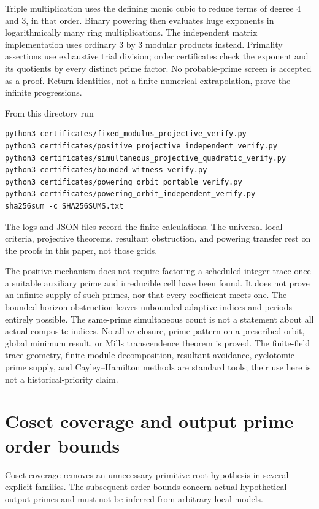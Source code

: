 \documentclass[11pt,a4paper]{article}
\theoremstyle{definition}\newtheorem{definition}[theorem]{Definition}
\theoremstyle{remark}\newtheorem{remark}[theorem]{Remark}
\begin{document}
Triple multiplication uses the defining monic cubic to reduce terms
of degree $4$ and $3$, in that order. Binary powering then evaluates
huge exponents in logarithmically many ring multiplications.
The independent matrix implementation uses ordinary $3$ by $3$
modular products instead. Primality assertions use exhaustive trial
division; order certificates check the exponent and its quotients by
every distinct prime factor. No probable-prime screen is accepted
as a proof. Return identities, not a finite numerical extrapolation,
prove the infinite progressions.

From this directory run
\begin{lstlisting}
python3 certificates/fixed_modulus_projective_verify.py
python3 certificates/positive_projective_independent_verify.py
python3 certificates/simultaneous_projective_quadratic_verify.py
python3 certificates/bounded_witness_verify.py
python3 certificates/powering_orbit_portable_verify.py
python3 certificates/powering_orbit_independent_verify.py
sha256sum -c SHA256SUMS.txt
\end{lstlisting}
The logs and JSON files record the finite calculations. The universal
local criteria, projective theorems, resultant obstruction, and
powering transfer rest on the proofs in this paper, not those grids.


The positive mechanism does not require factoring a scheduled integer
trace once a suitable auxiliary prime and irreducible cell have been
found. It does not prove an infinite supply of such primes, nor that
every coefficient meets one. The bounded-horizon obstruction leaves
unbounded adaptive indices and periods entirely possible. The
same-prime simultaneous count is not a statement about all actual
composite indices. No all-$m$ closure, prime pattern on a prescribed
orbit, global minimum result, or Mills transcendence theorem is proved.
The finite-field trace geometry, finite-module decomposition, resultant
avoidance, cyclotomic prime supply, and Cayley--Hamilton methods are
standard tools; their use here is not a historical-priority claim.



\endgroup

\section{Coset coverage and output prime order bounds}\label{src:R16}
Coset coverage removes an unnecessary primitive-root hypothesis in several explicit families. The subsequent order bounds concern actual hypothetical output primes and must not be inferred from arbitrary local models.
\medskip
\begingroup
\end{document}

